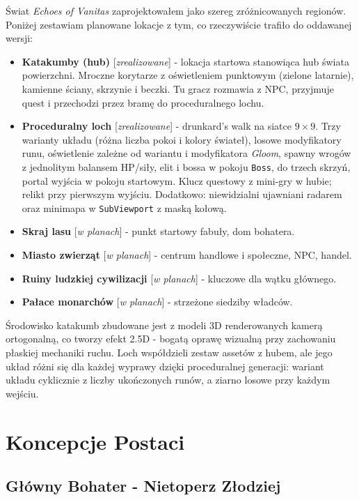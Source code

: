 Świat \textit{Echoes of Vanitas} zaprojektowałem jako szereg zróżnicowanych regionów. Poniżej zestawiam planowane lokacje z tym, co rzeczywiście trafiło do oddawanej wersji:

\begin{itemize}
    \item \textbf{Katakumby (hub)} [\textit{zrealizowane}] - lokacja startowa stanowiąca hub świata powierzchni. Mroczne korytarze z oświetleniem punktowym (zielone latarnie), kamienne ściany, skrzynie i beczki. Tu gracz rozmawia z NPC, przyjmuje quest i przechodzi przez bramę do proceduralnego lochu.
    \item \textbf{Proceduralny loch} [\textit{zrealizowane}] - drunkard's walk na siatce $9 \times 9$. Trzy warianty układu (różna liczba pokoi i kolory świateł), losowe modyfikatory runu, oświetlenie zależne od wariantu i modyfikatora \textit{Gloom}, spawny wrogów z jednolitym balansem HP/siły, elit i bossa w pokoju \texttt{Boss}, do trzech skrzyń, portal wyjścia w pokoju startowym. Klucz questowy z mini-gry w hubie; relikt przy pierwszym wyjściu. Dodatkowo: niewidzialni ujawniani radarem oraz minimapa w \texttt{SubViewport} z maską kołową.
    \item \textbf{Skraj lasu} [\textit{w planach}] - punkt startowy fabuły, dom bohatera.
    \item \textbf{Miasto zwierząt} [\textit{w planach}] - centrum handlowe i społeczne, NPC, handel.
    \item \textbf{Ruiny ludzkiej cywilizacji} [\textit{w planach}] - kluczowe dla wątku głównego.
    \item \textbf{Pałace monarchów} [\textit{w planach}] - strzeżone siedziby władców.
\end{itemize}

Środowisko katakumb zbudowane jest z modeli 3D renderowanych kamerą ortogonalną, co tworzy efekt 2.5D - bogatą oprawę wizualną przy zachowaniu płaskiej mechaniki ruchu. Loch współdzieli zestaw assetów z hubem, ale jego układ różni się dla każdej wyprawy dzięki proceduralnej generacji: wariant układu cyklicznie z liczby ukończonych runów, a ziarno losowe przy każdym wejściu.

\section{Koncepcje Postaci}

\subsection{Główny Bohater - Nietoperz Złodziej}

